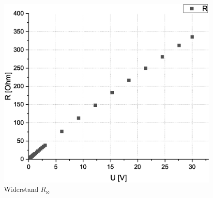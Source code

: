 \documentclass[10pt,a4paper]{article}
\begin{document}
\begin{flushleft}
\begin{figure}[H]
\centering
\includegraphics[scale=0.3]{Lampe}
\caption{Widerstand $R_{\otimes}$}
\label{fig:glampe}
\end{figure}
\end{flushleft}
\end{document}
